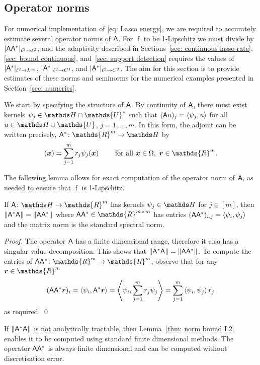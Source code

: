 \documentclass[smallextended]{svjour3}
\let\F\mathds\let\C\mathcal\newcommand{\R}{\F{R}}\newcommand{\A}{\tens{A}}
\newcommand{\norm}[1]{{\left\lVert #1 \right\rVert}}
\newcommand{\IP}[2]{\left\langle #1,#2 \right\rangle}
\newcommand{\op}[1]{\operatorname{#1}}
\newcommand{\1}{\F{1}}
\newcommand*{\varf}[1]{%
	\IfEqCase{#1}{%
		{0}{u}%
		{1}{v}%
		{2}{w}%
	}[u#1]%
}
\newcommand*{\spcf}[1]{%
	\IfEqCase{#1}{%
		{0}{\F{U}}%
		{1}{\F{V}}%
		{2}{\F{W}}%
	}[\F{U}#1]%
}
\newcommand*{\vard}[1]{%
	\IfEqCase{#1}{%
		{0}{\varphi}%
		{1}{\psi}%
	}[\varphi #1]%
}
\newcommand*{\varx}[1]{%
	\IfEqCase{#1}{%
		{0}{x}%
		{1}{y}%
		{2}{z}%
		{3}{r}%
	}[x#1]%
}
\newcommand{\Domain}{\Omega}\newcommand{\domain}{\omega}
\newcommand*{\vvarx}[1]{\vec{\varx{#1}}}
\newcommand{\edit}[2]{{\ifmmode\text{\color{red}\sout{\ensuremath{#1}}}\else {\color{red} \sout{#1}}\fi} {\color{darkgreen} #2}}
\begin{document}
	
	\subsection{Operator norms}\label{sec: smoothing operators}
	For numerical implementation of \edit{Lasso}{\eqref{eq: Lasso energy}}, we are required to accurately estimate several operator norms of $\A$. For $\op{f}$ to be 1-Lipschitz we must divide by $|\A\A^*|_{\ell^2\to\ell^2}$, and the adaptivity described in Sections~\ref{sec: continuous lasso rate}, \ref{sec: bound continuous}, and~\ref{sec: support detection} requires the values of $|\A^*|_{\ell^2\to L^\infty}$, $|\A^*|_{\ell^2\to C^1}$, and $|\A^*|_{\ell^2\to C^2}$. The aim for this section is to provide estimates of these norms and seminorms for the numerical examples presented in Section~\ref{sec: numerics}.
	
	We start by specifying the structure of $\A$. By continuity of $\A$, there must exist kernels $\vard1_j\in \F H\cap\spcf0^*$ such that $(\A\varf0)_j = \IP{\vard1_j}{\varf0}$ for all $\varf0\in \F H\cup\spcf0$, $j=1,\ldots,m$. In this form, the adjoint can be written precisely, $\A^*\colon\R^m\to \F H$ by 
	\begin{equation}
		[\A^*\vvarx3](\vvarx0) = \sum_{j=1}^m \varx3_j\vard1_j(\vvarx0) \qquad \text{ for all }\vvarx0\in\Domain,\ \vvarx3\in\R^m.
	\end{equation}
	
	The following lemma allows for exact computation of the operator norm of $\A$, as needed to ensure that $\op{f}$ is 1-Lipschitz.
	\begin{lemma}\label{thm: norm bound L2}
		If $\A\colon \F H \to \R^m$ has kernels $\vard1_j\in \F H$ for $j\in[m]$, then
		$ \norm{\A^*\A} = \norm{\A\A^*} $
		where $\A\A^*\in\R^{m\times m}$ has entries $(\A\A^*)_{i,j} = \IP{\vard1_i}{\vard1_j}$
		and the matrix norm is the standard spectral norm.
	\end{lemma}
	\begin{proof}
		The operator $\A$ has a finite dimensional range, therefore it also has a singular value decomposition. This shows that $ \norm{\A^*\A} = \norm{\A\A^*} $. To compute the entries of $\A\A^*\colon\R^m\to\R^m$, observe that for any $\vvarx3\in\R^m$
		\begin{equation}
			(\A\A^*\vvarx3)_i = \IP{\vard1_i}{\A^*\vvarx3} = \IP{\vard1_i}{\sum_{j=1}^m\varx3_j\vard1_j} = \sum_{j=1}^m \IP{\vard1_i}{\vard1_j}\varx3_j
		\end{equation}
		as required.
		\qed\end{proof}
	If $\norm{\A^*\A}$ is not analytically tractable, then Lemma~\ref{thm: norm bound L2} enables it to be computed using standard finite dimensional methods. The operator $\A\A^*$ is always finite dimensional and can be computed without discretisation error.
	
\end{document}
